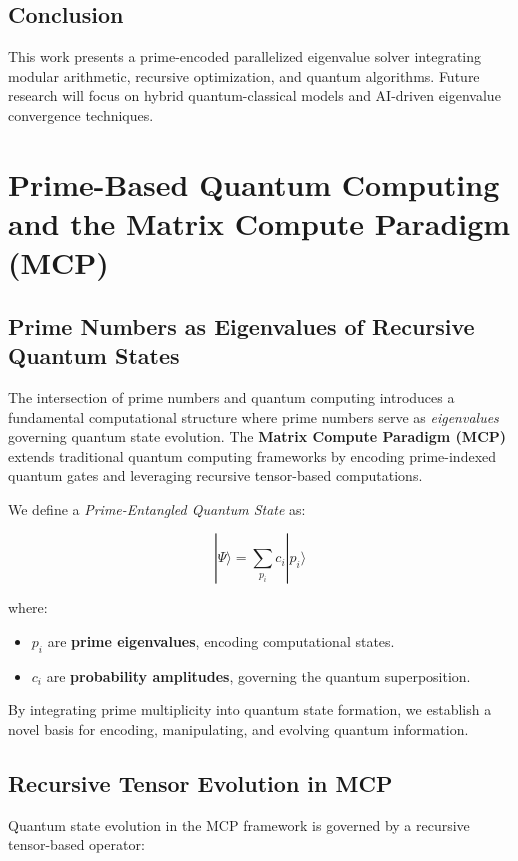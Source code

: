 \documentclass{article}
\theoremstyle{plain}
\theoremstyle{plain}
\theoremstyle{definition}
\theoremstyle{remark}
\begin{document}
\subsection{Conclusion}
This work presents a prime-encoded parallelized eigenvalue solver integrating modular arithmetic, recursive optimization, and quantum algorithms. Future research will focus on hybrid quantum-classical models and AI-driven eigenvalue convergence techniques.
\section{Prime-Based Quantum Computing and the Matrix Compute Paradigm (MCP)}

\subsection{Prime Numbers as Eigenvalues of Recursive Quantum States}

The intersection of prime numbers and quantum computing introduces a fundamental computational structure where prime numbers serve as \textit{eigenvalues} governing quantum state evolution. The \textbf{Matrix Compute Paradigm (MCP)} extends traditional quantum computing frameworks by encoding prime-indexed quantum gates and leveraging recursive tensor-based computations.

We define a \textit{Prime-Entangled Quantum State} as:

\begin{equation}
|\Psi\rangle = \sum_{p_i} c_i |p_i\rangle
\end{equation}

where:
\begin{itemize}
    \item $p_i$ are \textbf{prime eigenvalues}, encoding computational states.
    \item $c_i$ are \textbf{probability amplitudes}, governing the quantum superposition.
\end{itemize}

By integrating prime multiplicity into quantum state formation, we establish a novel basis for encoding, manipulating, and evolving quantum information.

\subsection{Recursive Tensor Evolution in MCP}

Quantum state evolution in the MCP framework is governed by a recursive tensor-based operator:
\end{document}
